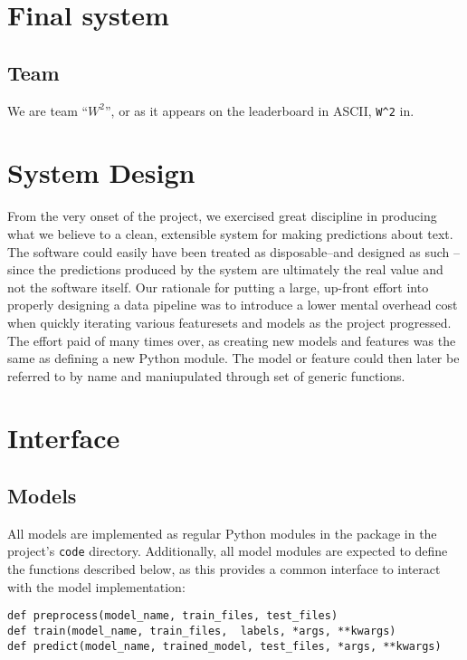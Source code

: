 \documentclass[
10pt, %
a4paper, %
oneside, %
headinclude,footinclude, %
BCOR5mm, %
]{scrartcl}
\begin{document}

\section{Final system}

\subsection{Team}

We are team ``$W^2$'', or as it appears on the leaderboard in ASCII,
\texttt{W\string^2} in.

\section{System Design}

From the very onset of the project, we exercised great discipline in producing
what we believe to a clean, extensible system for making predictions about text.
The software could easily have been treated as disposable--and designed as such
--since the predictions produced by the system are ultimately the real value and
not the software itself. Our rationale for putting a large, up-front effort into
properly designing a data pipeline was to introduce a lower mental overhead cost
when quickly iterating various featuresets and models as the project progressed.
The effort paid of many times over, as creating new models and features was the
same as defining a new Python module. The model or feature could then later be
referred to by name and maniupulated through set of generic functions.

\section{Interface}
\subsection{Models}

All models are implemented as regular Python modules in the
 package in the project's \texttt{code} directory.
Additionally, all model modules are expected to define the functions described
below, as this provides a common interface to interact with the model
implementation:

\begin{verbatim}
def preprocess(model_name, train_files, test_files)
def train(model_name, train_files,  labels, *args, **kwargs)
def predict(model_name, trained_model, test_files, *args, **kwargs)
\end{verbatim}
\end{document}

